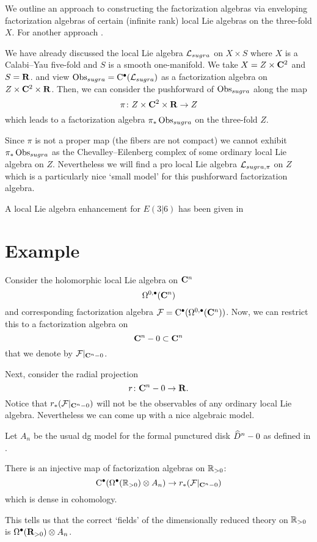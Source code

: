 We outline an approach to constructing the factorization algebras via enveloping factorization algebras of certain (infinite rank) local Lie algebras on the three-fold $X$. 
For another approach . 

We have already discussed the local Lie algebra $\cL_{sugra}$ on $X \times S$ where $X$ is a Calabi--Yau five-fold and $S$ is a smooth one-manifold. 
We take $X = Z \times \C^2$ and $S = \R$. 
and view $\Obs_{sugra} = \clie^\bu(\cL_{sugra})$ as a factorization algebra on $Z \times \C^2 \times \R$. 
Then, we can consider the pushforward of $\Obs_{sugra}$ along the map
\[
\pi \colon Z \times \C^2 \times \R \to Z 
\]
which leads to a factorization algebra $\pi_* \Obs_{sugra}$ on the three-fold $Z$. 

Since $\pi$ is not a proper map (the fibers are not compact) we cannot exhibit $\pi_*\Obs_{sugra}$ as the Chevalley--Eilenberg complex of some ordinary local Lie algebra on $Z$. 
Nevertheless we will find a pro local Lie algebra $\cL_{sugra,\pi}$ on $Z$ which is a particularly nice `small model' for this pushforward factorization algebra.

A local Lie algebra enhancement for $E(3|6)$ has been given in \cite{SWsuca6d} 







\section{Example} 

Consider the holomorphic local Lie algebra on $\C^n$
\[
\Omega^{0,\bu}(\C^n) 
\]
and corresponding factorization algebra $\cF = \clie^\bu(\Omega^{0,\bu}(\C^n))$. 
Now, we can restrict this to a factorization algebra on
\[
\C^n - 0 \subset \C^n
\]
that we denote by $\cF|_{\C^n - 0}$. 

Next, consider the radial projection
\[
r \colon \C^n - 0 \to \R .
\]
Notice that $r_* (\cF|_{\C^n - 0})$ will not be the observables of any ordinary local Lie algebra.
Nevertheless we can come up with a nice algebraic model.  

Let $A_n$ be the usual dg model for the formal punctured disk $\Hat{D}^n - 0$ as defined in \cite{FHK,GWkm}.

\begin{lem}
There is an injective map of factorization algebras on $\RR_{>0}$:
\[
\clie^\bu(\Omega^\bu(\RR_{>0}) \otimes A_n) \to r_* (\cF|_{\C^n - 0}) 
\]
which is dense in cohomology.
\end{lem}

This tells us that the correct `fields' of the dimensionally reduced theory on $\RR_{>0}$ is $\Omega^\bu(\R_{>0}) \otimes A_n$. 


%
